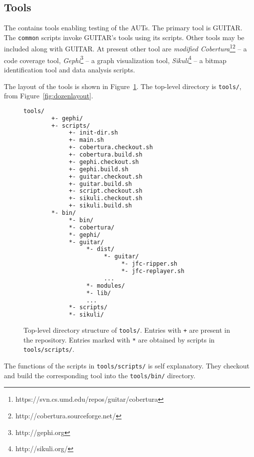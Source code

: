 %
%
\subsection{Tools}
\label{sec:tools}

The \mddozen{} contains tools enabling testing of the AUTs. The primary tool is GUITAR. The \texttt{common} scripts invoke GUITAR's tools using its scripts. Other tools may be included along with GUITAR. At present other tool are \textit{modified Cobertura}\footnote{https://svn.cs.umd.edu/repos/guitar/cobertura}\footnote{http://cobertura.sourceforge.net/} -- a code coverage tool, \textit{Gephi}\footnote{http://gephi.org} -- a graph visualization tool, \textit{Sikuli}\footnote{http://sikuli.org/} -- a bitmap identification tool and data analysis scripts.

The layout of the tools is shown in Figure~\ref{fig:toolslayout}. The top-level directory is \texttt{tools/}, from Figure~\ref{fig:dozenlayout}.

\begin{figure}
\scriptsize{
   \begin{lstlisting}[language=sh, showstringspaces=false, breaklines=true]
      tools/
        +- gephi/
        +- scripts/
             +- init-dir.sh
             +- main.sh
             +- cobertura.checkout.sh
             +- cobertura.build.sh
             +- gephi.checkout.sh
             +- gephi.build.sh
             +- guitar.checkout.sh
             +- guitar.build.sh
             +- script.checkout.sh
             +- sikuli.checkout.sh
             +- sikuli.build.sh
        *- bin/
             *- bin/
             *- cobertura/
             *- gephi/
             *- guitar/
                  *- dist/
                       *- guitar/
                            *- jfc-ripper.sh
                            *- jfc-replayer.sh
                       ...
                  *- modules/
                  *- lib/
                  ...
             *- scripts/
             *- sikuli/

   \end{lstlisting}
}
   \caption{Top-level directory structure of \texttt{tools/}. Entries with \texttt{+} are present in the \mddozen{} repository. Entries marked with \texttt{*} are obtained by scripts in \texttt{tools/scripts/}.}
   \label{fig:toolslayout}
\end{figure}

The functions of the scripts in \texttt{tools/scripts/} is self explanatory. They checkout and build the corresponding tool into the \texttt{tools/bin/} directory.

